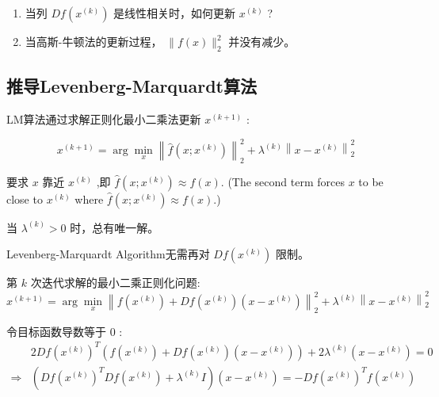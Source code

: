 \begin{enumerate}
    \item 当列 $ D f\left(x^{(k)}\right) $ 是线性相关时，如何更新 $ x^{(k)} $ ?
    \item 当高斯-牛顿法的更新过程， $ \|f(x)\|_{2}^{2} $ 并没有减少。
\end{enumerate}

\subsection{推导Levenberg-Marquardt算法}

LM算法通过求解正则化最小二乘法更新 $ x^{(k+1)} $ :

\begin{problem}
    \begin{equation}
    x^{(k+1)}=\arg \min _{x}\left\|\hat{f}\left(x ; x^{(k)}\right)\right\|_{2}^{2}+\lambda^{(k)}\left\|x-x^{(k)}\right\|_{2}^{2}
    \end{equation}

要求 $ x $ 靠近 $ x^{(k)} $ ,即 $ \hat{f}\left(x ; x^{(k)}\right) \approx f(x) $. (The second term forces $ x $ to be close to $ x^{(k)} $ where $ \hat{f}\left(x ; x^{(k)}\right) \approx f(x) $.)
\end{problem}

当 $ \lambda^{(k)}>0 $ 时，总有唯一解。

\begin{remark}
    Levenberg-Marquardt Algorithm无需再对 $Df \left(x^{(k)}\right) $ 限制。
\end{remark}

\begin{problem}
    第 $ k $ 次迭代求解的最小二乘正则化问题:
\begin{equation}
x^{(k+1)}=\arg \min _{x}\left\|f\left(x^{(k)}\right)+D f\left(x^{(k)}\right)\left(x-x^{(k)}\right)\right\|_{2}^{2}+\lambda^{(k)}\left\|x-x^{(k)}\right\|_{2}^{2}
\end{equation}
\end{problem}



令目标函数导数等于 0 :
\begin{equation}
\begin{aligned}
    & 2Df\left( x^{(k)}\right)^{T}\left( f\left( x^{(k)}\right) +Df\left( x^{(k)}\right)\left( x-x^{(k)}\right)\right) +2\lambda ^{(k)}\left( x-x^{(k)}\right) =0\\
   \Rightarrow  & \left( Df\left( x^{(k)}\right)^{T} Df\left( x^{(k)}\right) +\lambda ^{(k)} I\right)\left( x-x^{(k)}\right) =-Df\left( x^{(k)}\right)^{T} f\left( x^{(k)}\right)
   \end{aligned}
\end{equation}


